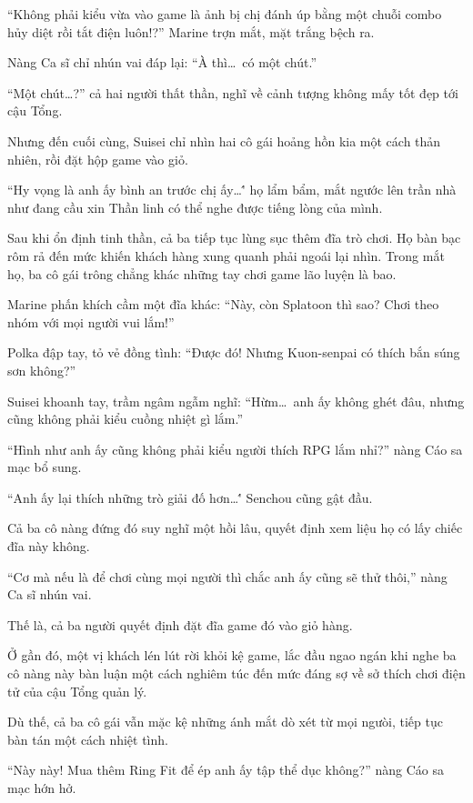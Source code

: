 \documentclass[../main.tex]{subfiles}
\begin{document}
``Không phải kiểu vừa vào game là ảnh bị chị đánh úp bằng một chuỗi combo hủy diệt rồi tắt điện luôn!?'' Marine trợn mắt, mặt trắng bệch ra.

Nàng Ca sĩ chỉ nhún vai đáp lại: ``À thì\dots\ có một chút.''

``Một chút\dots\!?'' cả hai người thất thần, nghĩ về cảnh tượng không mấy tốt đẹp tới cậu Tổng.

Nhưng đến cuối cùng, Suisei chỉ nhìn hai cô gái hoảng hồn kia một cách thản nhiên, rồi đặt hộp game vào giỏ.

``Hy vọng là anh ấy bình an trước chị ấy\dots\'' họ lẩm bẩm, mắt ngước lên trần nhà như đang cầu xin Thần linh có thể nghe được tiếng lòng của mình.

\ct

Sau khi ổn định tinh thần, cả ba tiếp tục lùng sục thêm đĩa trò chơi. Họ bàn bạc rôm rả đến mức khiến khách hàng xung quanh phải ngoái lại nhìn. Trong mắt họ, ba cô gái trông chẳng khác những tay chơi game lão luyện là bao.

Marine phấn khích cầm một đĩa khác: ``Này, còn Splatoon thì sao? Chơi theo nhóm với mọi người vui lắm!''

Polka đập tay, tỏ vẻ đồng tình: ``Được đó! Nhưng Kuon-senpai có thích bắn súng sơn không?''

Suisei khoanh tay, trầm ngâm ngẫm nghĩ: ``Hừm\dots\ anh ấy không ghét đâu, nhưng cũng không phải kiểu cuồng nhiệt gì lắm.''

``Hình như anh ấy cũng không phải kiểu người thích RPG lắm nhỉ?'' nàng Cáo sa mạc bổ sung.

``Anh ấy lại thích những trò giải đố hơn\dots\'' Senchou cũng gật đầu.

Cả ba cô nàng đứng đó suy nghĩ một hồi lâu, quyết định xem liệu họ có lấy chiếc đĩa này không.

``Cơ mà nếu là để chơi cùng mọi người thì chắc anh ấy cũng sẽ thử thôi,'' nàng Ca sĩ nhún vai.

Thế là, cả ba người quyết định đặt đĩa game đó vào giỏ hàng.

Ở gần đó, một vị khách lén lút rời khỏi kệ game, lắc đầu ngao ngán khi nghe ba cô nàng này bàn luận một cách nghiêm túc đến mức đáng sợ về sở thích chơi điện tử của cậu Tổng quản lý.

Dù thế, cả ba cô gái vẫn mặc kệ những ánh mắt dò xét từ mọi ngưòi, tiếp tục bàn tán một cách nhiệt tình.

``Này này! Mua thêm Ring Fit để ép anh ấy tập thể dục không?'' nàng Cáo sa mạc hớn hở.
\end{document}
